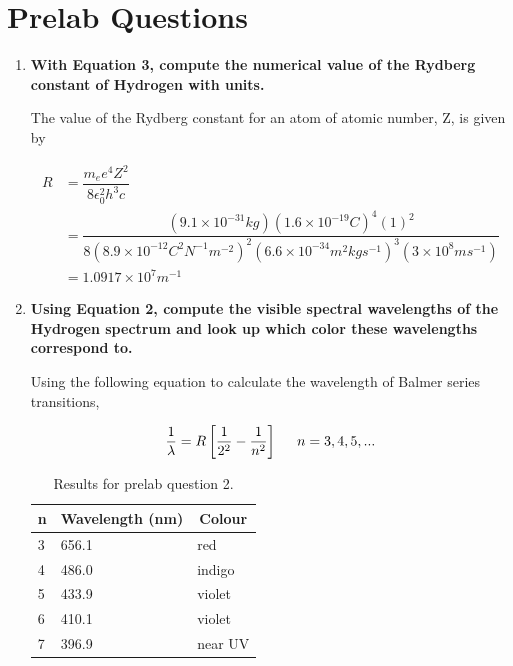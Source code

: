 \documentclass[justified]{tufte-book}
\begin{document}
\section{Prelab Questions}
\begin{enumerate}

\item {\bf With Equation 3, compute the numerical value of the Rydberg constant of Hydrogen with units.}\newline

The value of the Rydberg constant for an atom of atomic number, Z, is given by

\small
\begin{align}
R&=\dfrac{m_ee^4Z^2}{8\epsilon_0^2h^3c}\\
&=\dfrac{(9.1\times10^{-31}kg)(1.6\times10^{-19}C)^4(1)^2}{8(8.9\times10^{-12}C^2N^{-1}m^{-2})^2(6.6\times10^{-34}m^2kgs^{-1})^3(3\times10^8ms^{-1})}\\
&=1.0917\times10^{7}m^{-1}
\label{equ:spcg1}
\end{align}
\normalsize

\item {\bf Using Equation 2, compute the visible spectral wavelengths of the Hydrogen spectrum and look up which color these wavelengths correspond to.}\newline

Using the following equation to calculate the wavelength of Balmer series transitions,

\begin{equation}
\dfrac{1}{\lambda}=R\left[\dfrac{1}{2^2}-\dfrac{1}{n^2}\right] \hspace{5mm}n=3,4,5,...
\label{equ:spcg2}
\end{equation}

\begin{table}[ht]
\center
\begin{tabular}{|l|l|l|}
\hline
\multicolumn{1}{|c|}{n} & \multicolumn{1}{c|}{Wavelength (nm)} & \multicolumn{1}{c|}{Colour} \\ \hline
3                       & 656.1                                & red                         \\ \hline
4                       & 486.0                                & indigo                      \\ \hline
5                       & 433.9                                & violet                      \\ \hline
6                       & 410.1                                & violet                      \\ \hline
7                       & 396.9                                & near UV                     \\ \hline
\end{tabular}
\caption{Results for prelab question 2.}
\label{tab:spcg1}
\end{table}


\end{enumerate}
\end{document}
